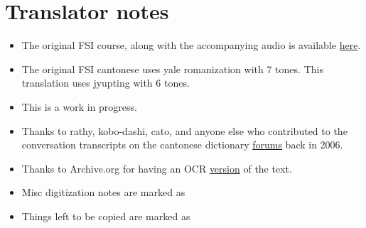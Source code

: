 \section{Translator notes}

\begin{itemize}
    \item The original FSI course, along with the accompanying audio is available \href{https://fsi-languages.yojik.eu/languages/FSI/fsi-cantonese.html}{here}.
    \item The original FSI cantonese uses yale romanization with 7 tones. This translation uses jyupting with 6 tones.
    \item This is a work in progress.
    \item Thanks to rathy, kobo-dashi, cato, and anyone else who contributed to the conversation transcripts on the cantonese dictionary \href{http://www.cantonese.sheik.co.uk/phorum/read.php?1,53361,page=1}{forums} back in 2006.
    \item Thanks to Archive.org for having an OCR \href{https://archive.org/stream/Fsi-CantoneseBasicCourse-StudentText/Fsi-CantoneseBasicCourse-Volume1-StudentText_djvu.txt}{version} of the text.
    \item Misc digitization notes are marked as 
    \item Things left to be copied are marked as 
\end{itemize}